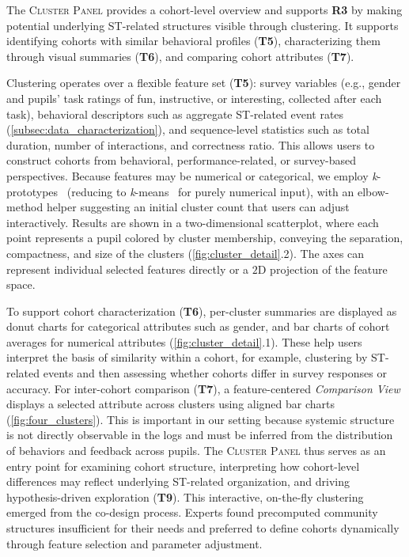 \documentclass[letterpaper,journal]{IEEEtran}
\begin{document}
The \textsc{Cluster Panel} provides a cohort-level overview and supports \textbf{R3} by making potential underlying ST-related structures visible through clustering. 
It supports identifying cohorts with similar behavioral profiles (\textbf{T5}), characterizing them through visual summaries (\textbf{T6}), and comparing cohort attributes (\textbf{T7}).

Clustering operates over a flexible feature set (\textbf{T5}): survey variables (e.g., gender and pupils' task ratings of fun, instructive, or interesting, collected after each task), behavioral descriptors such as aggregate ST-related event rates (\cref{subsec:data_characterization}), and sequence-level statistics such as total duration, number of interactions, and correctness ratio.
This allows users to construct cohorts from behavioral, performance-related, or survey-based perspectives. 
Because features may be numerical or categorical, we employ \textit{k}-prototypes~\cite{huang1998extensions} (reducing to \textit{k}-means~\cite{mcqueen1967some} for purely numerical input), with an elbow-method helper suggesting an initial cluster count that users can adjust interactively.
Results are shown in a two-dimensional scatterplot, where each point represents a pupil colored by cluster membership, conveying the separation, compactness, and size of the clusters (\cref{fig:cluster_detail}.2). 
The axes can represent individual selected features directly or a $2$D projection of the feature space.

To support cohort characterization (\textbf{T6}), per-cluster summaries are displayed as donut charts for categorical attributes such as gender, and bar charts of cohort averages for numerical attributes (\cref{fig:cluster_detail}.1). 
These help users interpret the basis of similarity within a cohort, for example, clustering by ST-related events and then assessing whether cohorts differ in survey responses or accuracy. 
For inter-cohort comparison (\textbf{T7}), a feature-centered \textit{Comparison View} displays a selected attribute across clusters using aligned bar charts (\cref{fig:four_clusters}). 
This is important in our setting because systemic structure is not directly observable in the logs and must be inferred from the distribution of behaviors and feedback across pupils. 
The \textsc{Cluster Panel} thus serves as an entry point for examining cohort structure, interpreting how cohort-level differences may reflect underlying ST-related organization, and driving hypothesis-driven exploration (\textbf{T9}). 
This interactive, on-the-fly clustering emerged from the co-design process. 
Experts found precomputed community structures insufficient for their needs and preferred to define cohorts dynamically through feature selection and parameter adjustment.
\end{document}
